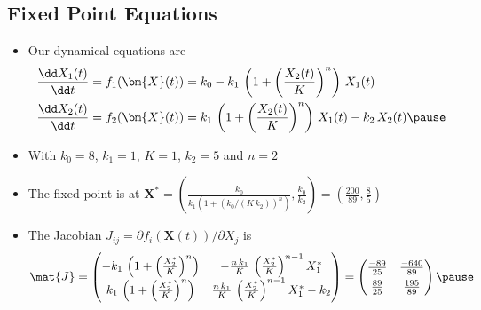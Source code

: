 
\begin{slide}
\section[-2]{Fixed Point Equations}

\begin{PauseHighLight}
  \begin{itemize}
  \item Our dynamical equations are
    {\small \begin{align*}
      \frac{\dd X_1(t)}{\dd t} &= f_1(\bm{X}(t))= k_0 -
       k_1\,\left(1+\left(\frac{X_2(t)}{K}\right)^n\right)\,X_1(t) \\
    \frac{\dd X_2(t)}{\dd t} &=f_2(\bm{X}(t))=
       k_1\,\left(1+\left(\frac{X_2(t)}{K}\right)^n\right)\,X_1(t)
                               -k_2\,X_2(t)\pause
    \end{align*}}
  \item With $k_0=8$, $k_1=1$, $K=1$, $k_2=5$ and $n=2$\pause
  \item The fixed point is at $\bm{X}^* = \left(\frac{k_0}{k_1(1+(k_0/(K\,k_2))^n)},
    \frac{k_0}{k_2}\right) = \left(\frac{200}{89}, \frac{8}{5}\right)$\pause
  \item The Jacobian $J_{ij} = \partial f_i(\bm{X}(t))/\partial X_j$ is
    {\small \begin{align*}
      \mat{J}=
      \begin{pmatrix}
        -k_1\,\left(1+\left(\frac{X_2^*}{K}\right)^n\right) & 
        - \frac{n\, k_1}{K}\,\left(\frac{X_2^*}{K}\right)^{n-1} X_1^* \\
        k_1\,\left(1+\left(\frac{X_2^*}{K}\right)^n\right) & 
        \frac{n\, k_1}{K}\,\left(\frac{X_2^*}{K}\right)^{n-1} X_1^* - k_2
      \end{pmatrix} =
      \begin{pmatrix}
        \frac{-89}{25} & \frac{-640}{89}\\
        \rule{0pt}{3ex} \frac{89}{25} & \frac{195}{89}
      \end{pmatrix}\pause
    \end{align*}}
  \end{itemize}
\end{PauseHighLight}

\end{slide}


